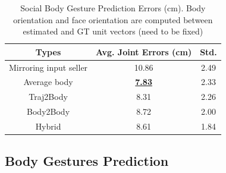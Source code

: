 \begin{table}[t]
	\centering
	
	\begin{tabular}{c| c| c}
		
		\hline
		Types & Avg. Joint Errors (cm) & Std.\\
		\hline
		Mirroring input seller & 10.86 &2.49\\
		\hline
		Average body & \underline {\textbf{7.83}} & 2.33\\
		\hline
		Traj2Body & 8.31 & 2.26\\
		\hline
		Body2Body & 8.72 & 2.00\\
		\hline
		Hybrid & 8.61  & 1.84\\
		\hline
	\end{tabular}
	\caption{Social Body Gesture Prediction Errors (cm). Body orientation and face orientation are computed between estimated and GT unit vectors (need to be fixed) \label{table:predBody_errors}}
\end{table}



\subsection{Body Gestures Prediction}

